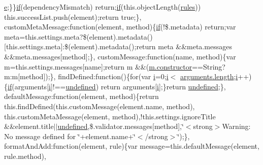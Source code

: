 \begin{DoxyCompactItemize}
\hyperlink{packages_2_respond_81_82_80_2content_2_scripts_2respond_8min_8js_a2c038346d47955cbe2cb91e338edd7e1}{e};\}\}\hyperlink{packages_2_respond_81_82_80_2content_2_scripts_2respond_8min_8js_a93851d60dd037a83509a1757b9ee7b66}{if}(dependency\+Mismatch) return;\hyperlink{packages_2_respond_81_82_80_2content_2_scripts_2respond_8min_8js_a93851d60dd037a83509a1757b9ee7b66}{if}(this.\+object\+Length(\hyperlink{packages_2_respond_81_82_80_2content_2_scripts_2respond_8js_ada87c2e257bc5ff6e77cdbc23ed986a3}{rules})) this.\+success\+List.\+push(element);return true;\}, custom\+Meta\+Message\+:function(element, method)\{\hyperlink{packages_2_respond_81_82_80_2content_2_scripts_2respond_8min_8js_a93851d60dd037a83509a1757b9ee7b66}{if}(!\$.metadata) return;var meta=this.\+settings.\+meta?\$(element).metadata()\mbox{[}this.\+settings.\+meta\mbox{]}\+:\$(element).metadata();return meta \&\&meta.\+messages \&\&meta.\+messages\mbox{[}method\mbox{]};\}, custom\+Message\+:function(name, method)\{var m=this.\+settings.\+messages\mbox{[}name\mbox{]};return m \&\&(\hyperlink{jquery-1_810_82-vsdoc_8js_ac8c7ab4467fc25f40e85c72221a1f10b}{m.\+constructor}==String?m\+:m\mbox{[}method\mbox{]});\}, find\+Defined\+:function()\{for(var \hyperlink{packages_2_respond_81_82_80_2content_2_scripts_2respond_8min_8js_a5e25b1d1bed9ab5f3174b76d6a722180}{i}=0;\hyperlink{packages_2_respond_81_82_80_2content_2_scripts_2respond_8min_8js_a5e25b1d1bed9ab5f3174b76d6a722180}{i}$<$ \hyperlink{jquery-1_810_82-vsdoc_8js_aa7de35d58da66d9944ab9cbe82c19640}{arguments.\+length};\hyperlink{packages_2_respond_81_82_80_2content_2_scripts_2respond_8min_8js_a5e25b1d1bed9ab5f3174b76d6a722180}{i}++)\{\hyperlink{packages_2_respond_81_82_80_2content_2_scripts_2respond_8min_8js_a93851d60dd037a83509a1757b9ee7b66}{if}(arguments\mbox{[}\hyperlink{packages_2_respond_81_82_80_2content_2_scripts_2respond_8min_8js_a5e25b1d1bed9ab5f3174b76d6a722180}{i}\mbox{]}!==\hyperlink{packages_2j_query_81_810_82_2_content_2_scripts_2jquery-1_810_82_8js_a08113a236cc18d2a9d5ce27e638012be}{undefined}) return arguments\mbox{[}\hyperlink{packages_2_respond_81_82_80_2content_2_scripts_2respond_8min_8js_a5e25b1d1bed9ab5f3174b76d6a722180}{i}\mbox{]};\}return \hyperlink{packages_2j_query_81_810_82_2_content_2_scripts_2jquery-1_810_82_8js_a08113a236cc18d2a9d5ce27e638012be}{undefined};\}, default\+Message\+:function(element, method)\{return this.\+find\+Defined(this.\+custom\+Message(element.\+name, method), this.\+custom\+Meta\+Message(element, method),!this.\+settings.\+ignore\+Title \&\&element.\+title$\vert$$\vert$\hyperlink{packages_2j_query_81_810_82_2_content_2_scripts_2jquery-1_810_82_8js_a08113a236cc18d2a9d5ce27e638012be}{undefined},\$.validator.\+messages\mbox{[}method\mbox{]},\char`\"{}$<$strong$>$Warning\+: No message defined for \char`\"{}+element.\+name+\char`\"{}$<$/strong$>$\char`\"{});\}, format\+And\+Add\+:function(element, rule)\{var message=this.\+default\+Message(element, rule.\+method), 
\end{DoxyCompactItemize}

